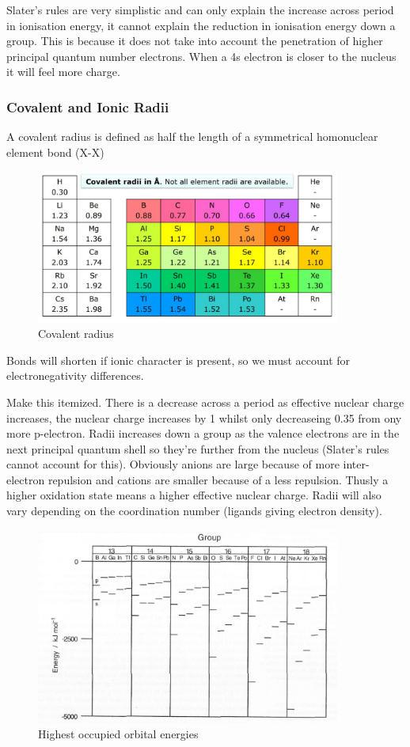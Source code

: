 \documentclass{article}
\newcommand{\NB}{{\large\lefthand}\quad}
\begin{document}
    Slater's rules are very simplistic and can only explain the increase across period in ionisation energy, it 
    cannot explain the reduction in ionisation energy down a group. This is because it does not take into account
    the penetration of higher principal quantum number electrons. When a 4s electron is closer to the nucleus 
    it will feel more charge.
    \newpage
    \subsubsection{Covalent and Ionic Radii}

    A covalent radius is defined as half the length of a symmetrical homonuclear element bond (X-X)

    \begin{figure}[h]
        \centering
        \includegraphics[width=10cm]{covrad.jpg}
        \caption{Covalent radius}
    \end{figure}

    \NB Bonds will shorten if ionic character is present, so we must account for electronegativity differences.

    Make this itemized.
    There is a decrease across a period as effective nuclear charge increases, the nuclear charge increases by 1
    whilst only decreaseing 0.35 from ony more p-electron. Radii increases down a group as the valence electrons
    are in the next principal quantum shell so they're further from the nucleus (Slater's rules cannot account
    for this). Obviously anions are large because of more inter-electron repulsion and cations are smaller because
    of a less repulsion. Thusly a higher oxidation state means a higher effective nuclear charge.
    Radii will also vary depending on the coordination number (ligands giving electron density).

    \begin{figure}[h]
        \centering
        \includegraphics[width=10cm]{s-psep.jpg}
        \caption{Highest occupied orbital energies}
    \end{figure}
\end{document}
